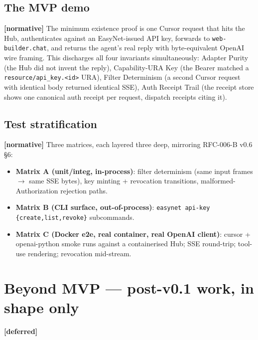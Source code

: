 \documentclass[11pt,a4paper]{article}
\newcommand{\normsv}{\textcolor{normativecolor}{\textbf{[normative]}}\xspace}
\newcommand{\deferred}{\textcolor{deferredcolor}{\textbf{[deferred]}}\xspace}
\theoremstyle{definition}
\begin{document}
\subsection{The MVP demo}

\normsv{} The minimum existence proof is one Cursor request that
hits the Hub, authenticates against an EasyNet-issued API key,
forwards to \texttt{web-builder.chat}, and returns the agent's
real reply with byte-equivalent OpenAI wire framing. This
discharges all four invariants simultaneously: Adapter Purity
(the Hub did not invent the reply), Capability-URA Key (the
Bearer matched a \texttt{resource/api\_key.<id>} URA),
Filter Determinism (a second Cursor request with identical body
returned identical SSE), Auth Receipt Trail (the receipt store
shows one canonical auth receipt per request, dispatch
receipts citing it).

\subsection{Test stratification}

\normsv{} Three matrices, each layered three deep, mirroring
RFC-006-B v0.6 §6:

\begin{itemize}[leftmargin=2em,itemsep=0.15em]
    \item \textbf{Matrix A (unit/integ, in-process)}: filter
    determinism (same input frames $\to$ same SSE bytes), key
    minting + revocation transitions, malformed-Authorization
    rejection paths.
    \item \textbf{Matrix B (CLI surface, out-of-process)}:
    \texttt{easynet api-key \{create,list,revoke\}} subcommands.
    \item \textbf{Matrix C (Docker e2e, real container, real
    OpenAI client)}: cursor + openai-python smoke runs against
    a containerised Hub; SSE round-trip; tool-use rendering;
    revocation mid-stream.
\end{itemize}

\section{Beyond MVP --- post-v0.1 work, in shape only}
\label{sec:post-mvp}

\deferred{}
\end{document}
